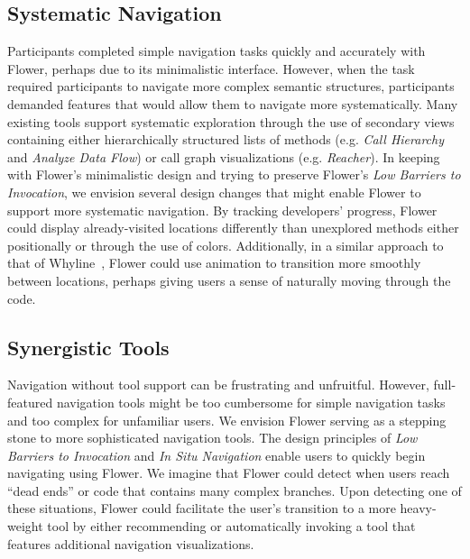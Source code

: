 \documentclass[conference]{IEEEtran}
\begin{document}
\subsection{Systematic Navigation}
Participants completed simple navigation tasks quickly and accurately with Flower, perhaps due to its minimalistic interface.
However, when the task required participants to navigate more complex semantic structures, participants demanded features that would allow them to navigate more systematically.
Many existing tools support systematic exploration through the use of secondary views containing either hierarchically structured lists of methods (e.g. \textit{Call Hierarchy} and \textit{Analyze Data Flow}) or call graph visualizations (e.g. \textit{Reacher}).
In keeping with Flower's minimalistic design and trying to preserve Flower's \textit{Low Barriers to Invocation}, we envision several design changes that might enable Flower  to support more systematic navigation.
By tracking developers' progress, Flower  could display already-visited locations differently than unexplored methods either positionally or through the use of colors.
Additionally, in a similar approach to that of Whyline~\cite{Whyline}, Flower  could use animation to transition more smoothly between locations, perhaps giving users a sense of naturally moving through the code.


\subsection{Synergistic Tools}
Navigation without tool support can be frustrating and unfruitful.
However, full-featured navigation tools might be too cumbersome for simple navigation tasks and too complex for unfamiliar users.
We envision Flower  serving as a stepping stone to more sophisticated navigation tools. 
The design principles of \textit{Low Barriers to Invocation} and \textit{In Situ Navigation} enable users to quickly begin navigating using Flower. 
We imagine that Flower  could detect when users reach ``dead ends'' or code that contains many complex branches.
Upon detecting one of these situations, Flower  could facilitate the user's transition to a more heavy-weight tool by either recommending or automatically invoking a tool that features additional navigation visualizations.
\end{document}
